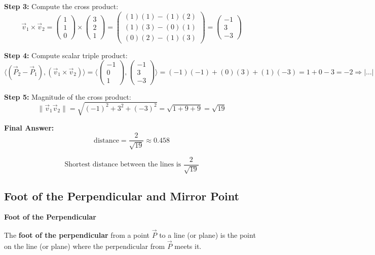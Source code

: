 \textbf{Step 3:} Compute the cross product:
\[
	\vec{v}_1 \times \vec{v}_2 =
	\begin{pmatrix} 1 \\ 1 \\ 0 \end{pmatrix} \times \begin{pmatrix} 3 \\ 2 \\ 1 \end{pmatrix}
	= \begin{pmatrix}
		(1)(1) - (1)(2) \\
		(1)(3) - (0)(1) \\
		(0)(2) - (1)(3)
	\end{pmatrix}
	= \begin{pmatrix}
		-1 \\ 3 \\ -3
	\end{pmatrix}
\]

\textbf{Step 4:} Compute scalar triple product:
\[
	\langle(\vec{P}_2 - \vec{P}_1), (\vec{v}_1 \times \vec{v}_2)\rangle =
	\langle\begin{pmatrix} -1 \\ 0 \\ 1 \end{pmatrix}, \begin{pmatrix} -1 \\ 3 \\ -3 \end{pmatrix}\rangle
	= (-1)(-1) + (0)(3) + (1)(-3) = 1 + 0 - 3 = -2
	\Rightarrow |\dots| = 2
\]

\textbf{Step 5:} Magnitude of the cross product:
\[
	\|\vec{v}_1  \vec{v}_2\|= \sqrt{(-1)^2 + 3^2 + (-3)^2} = \sqrt{1 + 9 + 9} = \sqrt{19}
\]

\textbf{Final Answer:}
\[
	\text{distance} = \frac{2}{\sqrt{19}} \approx 0.458
\]

\[
	\boxed{\text{Shortest distance between the lines is } \frac{2}{\sqrt{19}}}
\]

\subsection{Foot of the Perpendicular and Mirror Point}

\textbf{Foot of the Perpendicular}

The \textbf{foot of the perpendicular} from a point \(\vec{P}\) to a line (or plane) is the point on the line (or plane) where the perpendicular from \(\vec{P}\) meets it.

